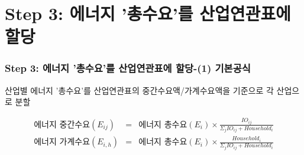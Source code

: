 \documentclass[10pt,compress,slidetop,%
			   hyperref={unicode},xcolor={svgnames},%
			   t]{beamer}
\begin{document}
\section{Step 3: 에너지 '총수요'를 산업연관표에 할당 }

\begin{frame}
	\frametitle{Step 3: 에너지 '총수요'를 산업연관표에 할당-(1) 기본공식}
\bigskip
산업별 에너지 '총수요'를 산업연관표의 중간수요액/가계수요액을 기준으로 각 산업으로 분할
\smallskip
\begin{small}
\begin{eqnarray*}
			\mbox{에너지 중간수요} (E_{ij})&=&\mbox{에너지 총수요}(E_i)\times\frac{IO_{ij}}{\Sigma_j IO_{ij}+Household_i}\\
			\mbox{에너지 가계수요} (E_{i,h})&=&\mbox{에너지 총수요}(E_i)\times\frac{Household_i}{\Sigma_j IO_{ij}+Household_i}\\
\end{eqnarray*}
\end{small}

		
\end{frame}
\end{document}
